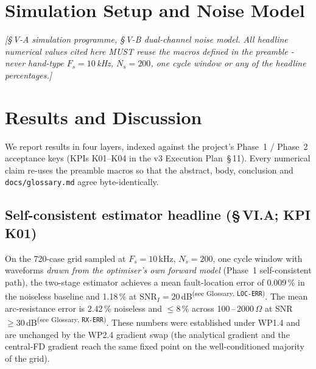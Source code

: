 \documentclass[journal]{IEEEtran}
\newcommand{\headlineLocErrNoiseless}{0.009\,\%}
\newcommand{\headlineLocErrSNR}%
  {1.18\,\% at $\mathrm{SNR}_I = 20$\,dB}
\newcommand{\headlineRxErrNoiseless}{2.42\,\%}
\newcommand{\headlineRxErrEnvelope}%
  {$\leq 8$\,\% across 100\,--\,2000\,$\Omega$ at SNR $\geq 30$\,dB}
\newcommand{\samplingConfig}%
  {$F_s = 10$\,kHz, $N_s = 200$, one cycle window}
\newcommand{\glossref}[1]{\textsuperscript{(see Glossary, \texttt{#1})}}
\begin{document}
\section{Simulation Setup and Noise Model}\label{sec:sim}
\textit{[\S\,V-A simulation programme, \S\,V-B dual-channel noise
model.  All headline numerical values cited here MUST reuse the
macros defined in the preamble - never hand-type
\samplingConfig{} or any of the headline percentages.]}

\section{Results and Discussion}\label{sec:results}

We report results in four layers, indexed against the project's
Phase~1 / Phase~2 acceptance keys (KPIs K01--K04 in the v3
Execution Plan~\S\,11).  Every numerical claim re-uses the
preamble macros so that the abstract, body, conclusion and
\texttt{docs/glossary.md} agree byte-identically.

\subsection{Self-consistent estimator headline (\S\,VI.A; KPI K01)}
\label{sec:resA}
On the 720-case grid sampled at \samplingConfig{} with waveforms
\emph{drawn from the optimiser's own forward model} (Phase~1
self-consistent path), the two-stage estimator achieves a mean
fault-location error of \headlineLocErrNoiseless{} in the noiseless
baseline and \headlineLocErrSNR{}\glossref{LOC-ERR}.  The mean
arc-resistance error is \headlineRxErrNoiseless{} noiseless and
\headlineRxErrEnvelope\glossref{RX-ERR}.  These numbers were
established under WP1.4 and are unchanged by the WP2.4 gradient
swap (the analytical gradient and the central-FD gradient reach the
same fixed point on the well-conditioned majority of the grid).

\end{document}

